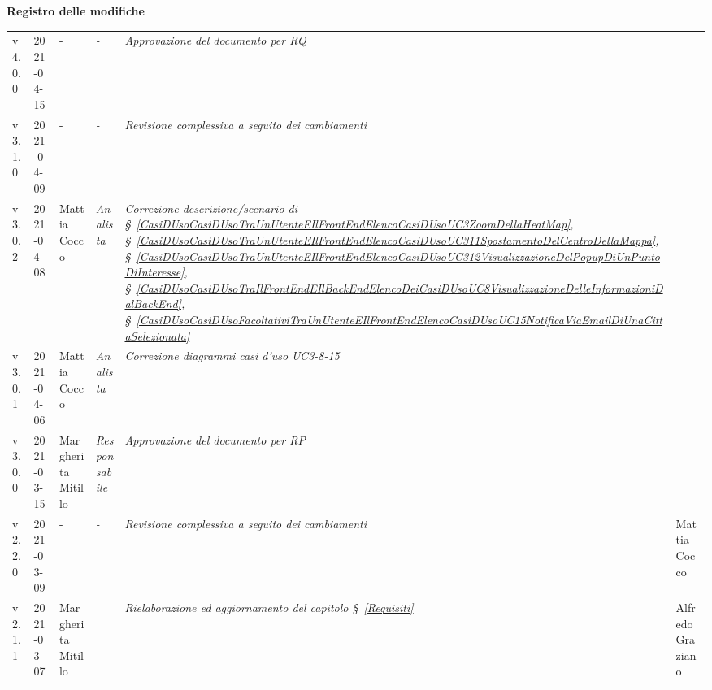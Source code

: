 \quad
\begin{center}
	\LARGE\textbf{Registro delle modifiche}
\end{center}
\def\tabularxcolumn#1{m{#1}}
{

\begin{center}
	\renewcommand{\arraystretch}{1.4}
	\begin{longtable}[c]{|p{2cm-1\tabcolsep}|p{2cm}|p{3cm-2\tabcolsep}|p{}|p{4cm-2\tabcolsep}|p{}|}
		\hline
		\rowcolor{airforceblue}
		\makecell[c]{\textbf{Versione}} & \makecell[c]{\textbf{Data}} & \makecell[c]{\textbf{Autore}} & \makecell[c]{\textbf{Ruolo}} & \makecell[c]{\textbf{Modifica}} & \makecell[c]{\textbf{Verificatore}} \\
		\hline
		\centering v4.0.0 & 2021-04-15 & \centering - & \centering \textit{-} & \textit{Approvazione del documento per RQ} & \makecell[c]{Andrea Cecchin}\\
		\hline
		\centering v3.1.0 & 2021-04-09 & \centering - & \centering \textit{-} & \textit{Revisione complessiva a seguito dei cambiamenti} & \makecell[c]{Andrea Cecchin}\\
		\hline
		\centering v3.0.2 & 2021-04-08 & Mattia Cocco & \centering \textit{Analista} & \textit{Correzione descrizione/scenario di \S~\ref{CasiDUsoCasiDUsoTraUnUtenteEIlFrontEndElencoCasiDUsoUC3ZoomDellaHeatMap}, \S~\ref{CasiDUsoCasiDUsoTraUnUtenteEIlFrontEndElencoCasiDUsoUC311SpostamentoDelCentroDellaMappa}, \S~\ref{CasiDUsoCasiDUsoTraUnUtenteEIlFrontEndElencoCasiDUsoUC312VisualizzazioneDelPopupDiUnPuntoDiInteresse}, \S~\ref{CasiDUsoCasiDUsoTraIlFrontEndEIlBackEndElencoDeiCasiDUsoUC8VisualizzazioneDelleInformazioniDalBackEnd}, \S~\ref{CasiDUsoCasiDUsoFacoltativiTraUnUtenteEIlFrontEndElencoCasiDUsoUC15NotificaViaEmailDiUnaCittaSelezionata}} &  \makecell[c]{Andrea Cecchin} \\
		\hline
		\centering v3.0.1 & 2021-04-06 & Mattia Cocco & \centering \textit{Analista} & \textit{Correzione diagrammi casi d'uso UC3-8-15} & \makecell[c]{Andrea Cecchin}\\
		\hline
		\centering v3.0.0 & 2021-03-15 & Margherita Mitillo & \centering \textit{Responsabile} & \textit{Approvazione del documento per RP} & \makecell[c]{-}\\
		\hline
		\centering v2.2.0 & 2021-03-09 &\centering - & \centering \textit{-} &\textit{Revisione complessiva a seguito dei cambiamenti} & Mattia Cocco\\
		\hline
		\centering v2.1.1 & 2021-03-07 & Margherita Mitillo & \centering{ \textit{Analista} }&\textit{Rielaborazione ed aggiornamento del capitolo \S~\ref{Requisiti}} &  Alfredo Graziano  \\

\end{longtable}
\end{center}}
